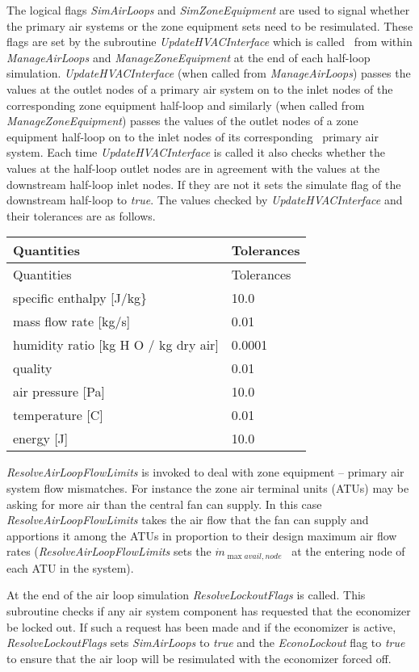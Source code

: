 The logical flags \emph{SimAirLoops} and \emph{SimZoneEquipment} are used to signal whether the primary air systems or the zone equipment sets need to be resimulated. These flags are set by the subroutine \emph{UpdateHVACInterface} which is called~ from within \emph{ManageAirLoops} and \emph{ManageZoneEquipment} at the end of each half-loop simulation. \emph{UpdateHVACInterface} (when called from \emph{ManageAirLoops}) passes the values at the outlet nodes of a primary air system on to the inlet nodes of the corresponding zone equipment half-loop and similarly (when called from \emph{ManageZoneEquipment}) passes the values of the outlet nodes of a zone equipment half-loop on to the inlet nodes of its corresponding~ primary air system. Each time \emph{UpdateHVACInterface} is called it also checks whether the values at the half-loop outlet nodes are in agreement with the values at the downstream half-loop inlet nodes. If they are not it sets the simulate flag of the downstream half-loop to \emph{true}. The values checked by \emph{UpdateHVACInterface} and their tolerances are as follows.

\begin{longtable}[c]{@{}ll@{}}
\toprule 
Quantities & Tolerances \tabularnewline
\midrule
\endfirsthead

\toprule 
Quantities & Tolerances \tabularnewline
\midrule
\endhead

specific enthalpy [J/kg\} & 10.0 \tabularnewline
mass flow rate [kg/s] & 0.01 \tabularnewline
humidity ratio [kg H  O / kg dry air] & 0.0001 \tabularnewline
quality & 0.01 \tabularnewline
air pressure [Pa] & 10.0 \tabularnewline
temperature [C] & 0.01 \tabularnewline
energy [J] & 10.0 \tabularnewline
\bottomrule
\end{longtable}

\emph{ResolveAirLoopFlowLimits} is invoked to deal with zone equipment -- primary air system flow mismatches. For instance the zone air terminal units (ATUs) may be asking for more air than the central fan can supply. In this case \emph{ResolveAirLoopFlowLimits} takes the air flow that the fan can supply and apportions it among the ATUs in proportion to their design maximum air flow rates (\emph{ResolveAirLoopFlowLimits} sets the \({\dot m_{\max avail,node}}\) ~at the entering node of each ATU in the system).

At the end of the air loop simulation \emph{ResolveLockoutFlags} is called. This subroutine checks if any air system component has requested that the economizer be locked out. If such a request has been made and if the economizer is active, \emph{ResolveLockoutFlags} sets \emph{SimAirLoops} to \emph{true} and the \emph{EconoLockout} flag to \emph{true} to ensure that the air loop will be resimulated with the economizer forced off.
